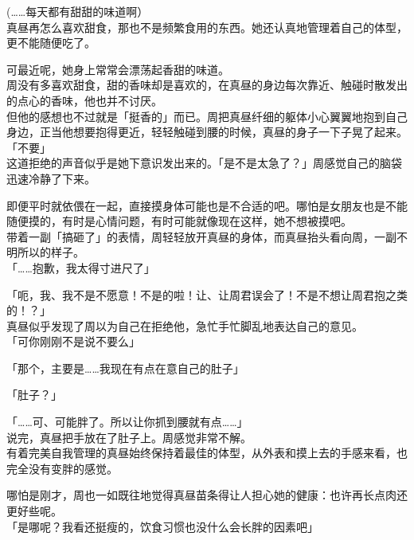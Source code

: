 (……每天都有甜甜的味道啊）\\

真昼再怎么喜欢甜食，那也不是频繁食用的东西。她还认真地管理着自己的体型，更不能随便吃了。

可最近呢，她身上常常会漂荡起香甜的味道。\\

周没有多喜欢甜食，甜的香味却是喜欢的，在真昼的身边每次靠近、触碰时散发出的点心的香味，他也并不讨厌。\\

但他的感想也不过就是「挺香的」而已。周把真昼纤细的躯体小心翼翼地抱到自己身边，正当他想要抱得更近，轻轻触碰到腰的时候，真昼的身子一下子晃了起来。\\

「不要」\\

这道拒绝的声音似乎是她下意识发出来的。「是不是太急了？」周感觉自己的脑袋迅速冷静了下来。

即便平时就依偎在一起，直接摸身体可能也是不合适的吧。哪怕是女朋友也是不能随便摸的，有时是心情问题，有时可能就像现在这样，她不想被摸吧。\\

带着一副「搞砸了」的表情，周轻轻放开真昼的身体，而真昼抬头看向周，一副不明所以的样子。\\

「……抱歉，我太得寸进尺了」

「呃，我、我不是不愿意！不是的啦！让、让周君误会了！不是不想让周君抱之类的！？」\\

真昼似乎发现了周以为自己在拒绝他，急忙手忙脚乱地表达自己的意见。\\

「可你刚刚不是说不要么」

「那个，主要是……我现在有点在意自己的肚子」

「肚子？」

「……可、可能胖了。所以让你抓到腰就有点……」\\

说完，真昼把手放在了肚子上。周感觉非常不解。\\

有着完美自我管理的真昼始终保持着最佳的体型，从外表和摸上去的手感来看，也完全没有变胖的感觉。

哪怕是刚才，周也一如既往地觉得真昼苗条得让人担心她的健康：也许再长点肉还更好些呢。\\

「是哪呢？我看还挺瘦的，饮食习惯也没什么会长胖的因素吧」\\

